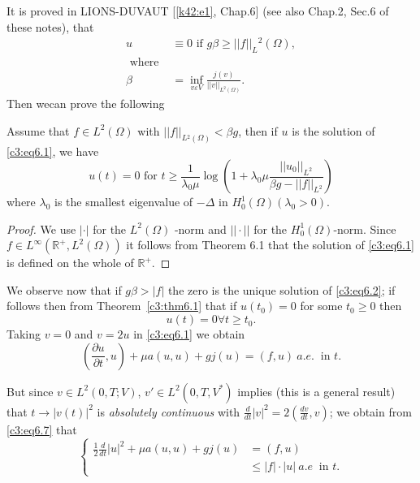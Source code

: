 It is proved in LIONS-DUVAUT [\ref{k42:e1}, Chap.6] (see also Chap.2, Sec.6 of
these notes), that 
\begin{align*}
u & \equiv 0 \text { if } g \beta \geq ||f||_L{^2} (\Omega) , \tag{6.3}\label{c3:eq6.3}\\
\text{ where }\\
\beta  & =\inf_{v \varepsilon V} \frac{j (v)} {||v||_{L^2 (\Omega)}}. \tag{6.4}\label{c3:eq6.4}
\end{align*}
Then we\pageoriginale  can prove the following

\begin{theorem}\label{c3:thm6.2}%
Assume that $f \in L^2 (\Omega)$ with $||f||_{L{^2} (\Omega)} < \beta g$, then if $u$ is the solution of  \eqref{c3:eq6.1}, we have
\begin{equation}
u (t) = 0 \text{ for } t \geq \frac{1}{\lambda_0 \mu} \log (1 + \lambda_0 \mu \frac{||u_0||_{L^2}} {\beta g - ||f||_{L^2}}) \tag{6.5}\label{c3:eq6.5}
\end{equation}
where $\lambda_0$ is the smallest eigenvalue of $- \Delta$ in $H^1_0 (\Omega) (\lambda_0 > 0)$.
\end{theorem}

\begin{proof}
We use $|\cdot|$ for the $L^2 (\Omega)$ -norm and $||\cdot||$ for the $H^1_0 (\Omega)$-norm. Since $f \in L^\infty (\mathbb{R}^+, L^2 (\Omega))$ it follows from Theorem 6.1 that the solution of \eqref{c3:eq6.1} is defined on the whole of $\mathbb{R}^+$.
\end{proof}

We observe now that if $g \beta > |f|$ the zero is the unique solution
of \eqref{c3:eq6.2}; if follows then from Theorem~\ref{c3:thm6.1} that
if $u(t_0) = 0$ for some $t_0 \geq 0$ then 
\begin{equation}
u (t) = 0 \forall t \geq t_0. \tag{6.6}\label{c3:eq6.6}
\end{equation}
Taking $v=0$ and $v = 2 u$ in \eqref{c3:eq6.1} we obtain
\begin{equation}
(\frac{\partial u} {\partial t}, u) + \mu a (u, u) + gj (u) = (f, u) ~ a.e. ~ \text { in } t. \tag{6.7}\label{c3:eq6.7}
\end{equation}

But since $v \in L^2 (0, T; V)$, $v' \in L^2 (0, T, V^*)$ implies (this is a general result) that $t \to |v(t)|^2$ is \textit {absolutely continuous} with $\frac{d}{dt} |v|^2 = 2 (\frac{dv}{dt}, v)$; we obtain from  \eqref{c3:eq6.7} that
\begin{equation}
\begin{cases}
\frac{1}{2} \frac{d}{dt} |u|^2 + \mu a (u, u) + gj (u) & = (f, u) \\
 & \leq |f| \cdot |u| ~ a.e  ~ \text{ in } t. \tag{6.8}\label{c3:eq6.8}
\end{cases}
\end{equation}

